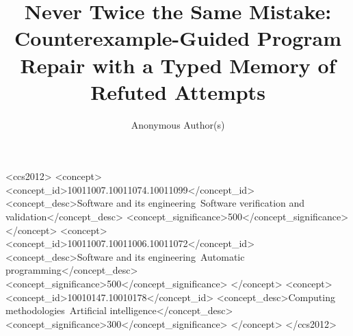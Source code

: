\documentclass[sigconf,anonymous,review]{acmart}
\theoremstyle{acmdefinition}\newtheorem{assumption}{Assumption}}{}
\theoremstyle{acmdefinition}\newtheorem{remark}[theorem]{Remark}}{}
\begin{document}
\title{Never Twice the Same Mistake: Counterexample-Guided Program Repair
  with a Typed Memory of Refuted Attempts}

\author{Anonymous Author(s)}

\begin{abstract}

\end{abstract}

\begin{CCSXML}
<ccs2012>
<concept>
<concept_id>10011007.10011074.10011099</concept_id>
<concept_desc>Software and its engineering~Software verification and validation</concept_desc>
<concept_significance>500</concept_significance>
</concept>
<concept>
<concept_id>10011007.10011006.10011072</concept_id>
<concept_desc>Software and its engineering~Automatic programming</concept_desc>
<concept_significance>500</concept_significance>
</concept>
<concept>
<concept_id>10010147.10010178</concept_id>
<concept_desc>Computing methodologies~Artificial intelligence</concept_desc>
<concept_significance>300</concept_significance>
</concept>
</ccs2012>
\end{CCSXML}



\maketitle










% 







\appendix

\end{document}
